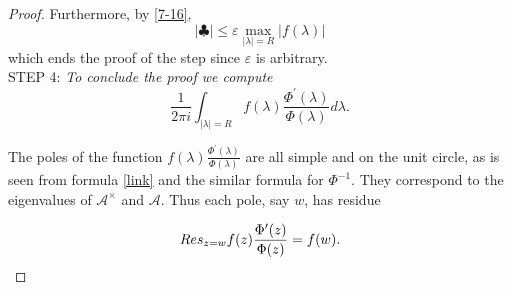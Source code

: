 \documentclass[10pt,a4paper]{amsart}
\newcommand{\e}{\varepsilon}
\begin{document}
\begin{proof}
Furthermore, by \eqref{7-16},
\[
  |\clubsuit|\le\e \max_{|\lambda|=R}|f(\lambda)|
\]
which ends the proof of the step since $\e$ is arbitrary.\\


STEP 4: {\sl To conclude the proof we compute
  \begin{equation}
    \label{residue-567}
\frac{1}{2\pi i}\int_{|\lambda|=R}f(\lambda)\frac{\Phi^\prime(\lambda)}{\Phi(\lambda)}d\lambda.
    \end{equation}
}

The poles of the function $f(\lambda)\frac{\Phi^\prime(\lambda)}{\Phi(\lambda)}$ are all simple and on the unit circle, as is seen from formula \eqref{link} and the similar
formula for $\Phi^{-1}$. They correspond to the eigenvalues of $\mathcal A^\times$
and $\mathcal A$. Thus each pole, say $w$, has residue



\[
          {\rm Res}_{z=w}f(z)\frac{\Phi^\prime(z)}{\Phi(z)}=f(w).
        \]
        \end{proof}
\end{document}
